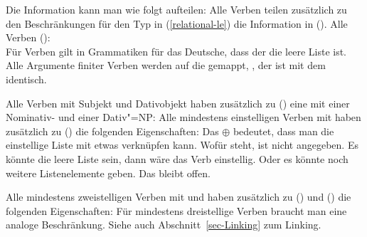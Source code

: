 \noindent
Die Information kann man wie folgt aufteilen: Alle Verben teilen zusätzlich zu den Beschränkungen
für den Typ  in (\ref{relational-le}) die Information
in ().
\ea
Alle Verben ():\\
\z
Für Verben gilt in Grammatiken für das Deutsche, dass der \sprw die leere Liste ist. Alle Argumente finiter Verben werden auf die
\compsl gemappt, \dash, der \argstw ist mit dem \compsw identisch.

Alle Verben mit Subjekt und Dativobjekt  haben zusätzlich zu () eine \argstl
mit einer Nominativ- und einer Dativ"=NP:
\ea
{}
\z
Alle mindestens einstelligen Verben mit \argone haben zusätzlich
zu () die folgenden Eigenschaften:
\ea
\label{bsp-linking-arg1}%
\z
Das $\oplus$ \etag bedeutet, dass man die einstellige Liste mit etwas verknüpfen kann. Wofür \etag
steht, ist nicht angegeben. Es könnte die leere Liste sein, dann wäre das Verb einstellig. Oder es
könnte noch weitere Listenelemente geben. Das bleibt offen.

Alle mindestens zweistelligen Verben mit \argone und \argtwo haben zusätzlich
zu () und () die folgenden Eigenschaften:
\ea
\label{bsp-linking-arg2}%
\z
Für mindestens dreistellige Verben braucht man eine analoge Beschränkung. 
Siehe auch Abschnitt~\ref{sec-Linking} zum Linking. 

